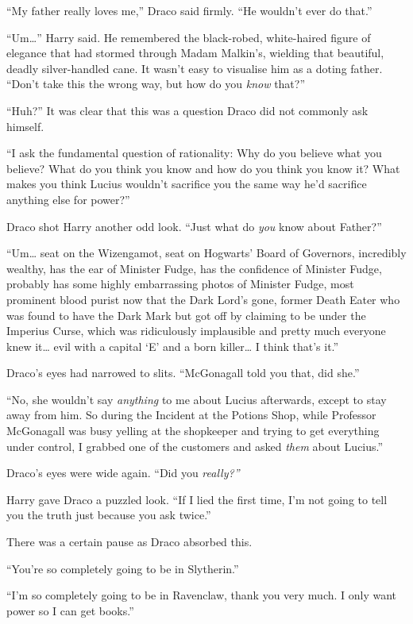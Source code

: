 ``My father really loves me,'' Draco said firmly. ``He wouldn't ever do
that.''

``Um\ldots{}'' Harry said. He remembered the black-robed, white-haired
figure of elegance that had stormed through Madam Malkin's, wielding
that beautiful, deadly silver-handled cane. It wasn't easy to visualise
him as a doting father. ``Don't take this the wrong way, but how do you
\emph{know} that?''

``Huh?'' It was clear that this was a question Draco did not commonly
ask himself.

``I ask the fundamental question of rationality: Why do you believe what
you believe? What do you think you know and how do you think you know
it? What makes you think Lucius wouldn't sacrifice you the same way he'd
sacrifice anything else for power?''

Draco shot Harry another odd look. ``Just what do \emph{you} know about
Father?''

``Um\ldots{} seat on the Wizengamot, seat on Hogwarts' Board of
Governors, incredibly wealthy, has the ear of Minister Fudge, has the
confidence of Minister Fudge, probably has some highly embarrassing
photos of Minister Fudge, most prominent blood purist now that the Dark
Lord's gone, former Death Eater who was found to have the Dark Mark but
got off by claiming to be under the Imperius Curse, which was
ridiculously implausible and pretty much everyone knew it\ldots{} evil
with a capital `E' and a born killer\ldots{} I think that's it.''

Draco's eyes had narrowed to slits. ``McGonagall told you that, did
she.''

``No, she wouldn't say \emph{anything} to me about Lucius afterwards,
except to stay away from him. So during the Incident at the Potions
Shop, while Professor McGonagall was busy yelling at the shopkeeper and
trying to get everything under control, I grabbed one of the customers
and asked \emph{them} about Lucius.''

Draco's eyes were wide again. ``Did you \emph{really?''}

Harry gave Draco a puzzled look. ``If I lied the first time, I'm not
going to tell you the truth just because you ask twice.''

There was a certain pause as Draco absorbed this.

``You're so completely going to be in Slytherin.''

``I'm so completely going to be in Ravenclaw, thank you very much. I
only want power so I can get books.''


